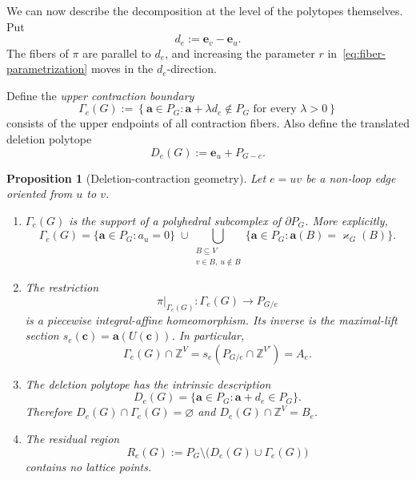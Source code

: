 \documentclass[11pt]{article}
\theoremstyle{plain}
\newtheorem{proposition}[theorem]{Proposition}
\theoremstyle{definition}
\newcommand{\ba}{\mathbf{a}}
\newcommand{\bc}{\mathbf{c}}
\newcommand{\be}{\mathbf{e}}
\newcommand{\kp}{\varkappa}
\newcommand{\ZZ}{\mathbb Z}
\numberwithin{equation}{section}
\begin{document}
We can now describe the decomposition at the level of the polytopes themselves.  Put
\[
   d_e:=\be_v-\be_u.
\]
The fibers of $\pi$ are parallel to $d_e$, and increasing the parameter $r$
in~\eqref{eq:fiber-parametrization} moves in the $d_e$-direction.

Define the \emph{upper contraction boundary}
\begin{equation}
 \Gamma_e(G):=
 \left\{\ba\in P_G:
 \ba+\lambda d_e\notin P_G\text{ for every }\lambda>0\right\}
\label{eq:upper-boundary}
\end{equation}
consists of the upper endpoints of all contraction fibers.
Also define the translated deletion polytope
\begin{equation}
   D_e(G):=\be_u+P_{G-e}.
\label{eq:deletion-polytope}
\end{equation}

\begin{proposition}[Deletion-contraction geometry]
\label{prop:polyhedral-section}
Let $e=uv$ be a non-loop edge oriented from $u$ to $v$.
\begin{enumerate}
\item[(i)] $\Gamma_e(G)$ is the support of a polyhedral subcomplex of
$\partial P_G$.  More explicitly,
\begin{equation}
 \Gamma_e(G)=
 \{\ba\in P_G:a_u=0\}
 \;\cup\!
 \bigcup_{\substack{B\subseteq V\\v\in B,\ u\notin B}}
 \{\ba\in P_G:\ba(B)=\kp_G(B)\}.
\label{eq:upper-boundary-faces}
\end{equation}

\item[(ii)] The restriction
\[
   \pi|_{\Gamma_e(G)}:\Gamma_e(G)\longrightarrow P_{G/e}
\]
is a piecewise integral-affine homeomorphism. Its inverse is the maximal-lift
section $s_e(\bc)=\ba(U(\bc))$.  In particular,
\begin{equation}
   \Gamma_e(G)\cap\ZZ^V
   =s_e(P_{G/e}\cap\ZZ^{V'})=A_e.
\label{eq:gamma-lattice-points}
\end{equation}

\item[(iii)] The deletion polytope has the intrinsic description
\begin{equation}
   D_e(G)=\{\ba\in P_G:\ba+d_e\in P_G\}.
\label{eq:deletion-movable}
\end{equation}
Therefore $D_e(G)\cap\Gamma_e(G)=\varnothing$ and  $D_e(G)\cap\ZZ^V=B_e.$

\item[(iv)] The residual region
  \[
   R_e(G):=P_G\setminus\bigl(D_e(G)\cup\Gamma_e(G)\bigr)
  \]
contains no lattice points.
\end{enumerate}
\end{proposition}
\end{document}
